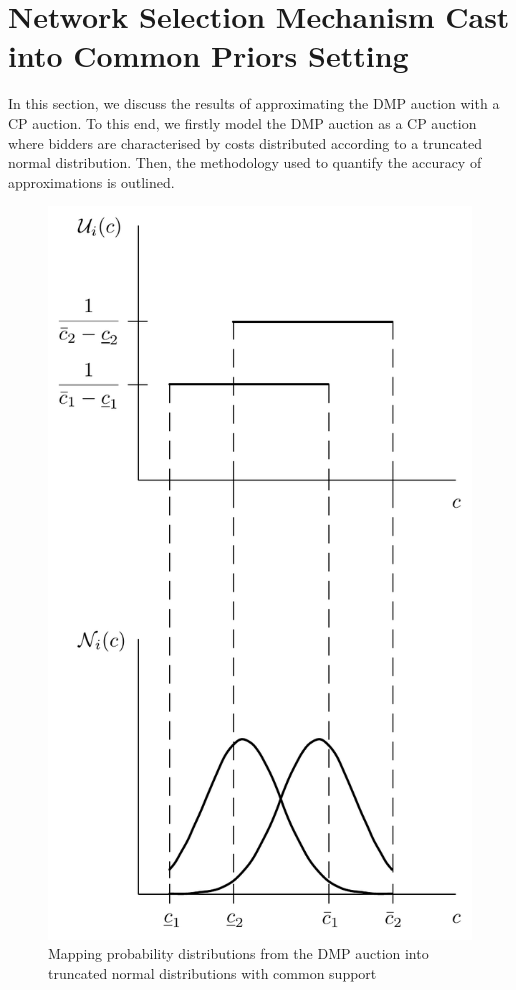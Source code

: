 

\section{Network Selection Mechanism Cast into Common Priors Setting} %
\label{sec:network_selection_mechanism_cast_into_common_priors_setting_approximation}
In this section, we discuss the results of approximating the DMP auction with a CP auction. To this end, we firstly model the DMP auction as a CP auction where bidders are characterised by costs distributed according to a truncated normal distribution. Then, the methodology used to quantify the accuracy of approximations is outlined.

\begin{figure}[p!]
  \includegraphics[width=\figsize]{Approximation/Figures/dmp_to_common_priors}
  \caption{Mapping probability distributions from the DMP auction into truncated normal distributions with common support}
  \label{fig:dmp_to_common_priors_approximation}
\end{figure}

